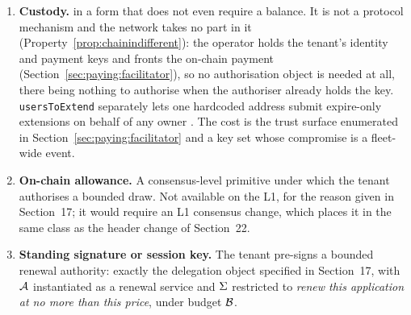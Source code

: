 \begin{enumerate}\setlength{\itemsep}{2pt}
\item \textbf{Custody.} 
in a form that does not even require a balance. It is not a protocol mechanism and the network takes
no part in it (Property~\ref{prop:chainindifferent}): the operator holds the tenant's identity and
payment keys and fronts the on-chain payment (Section~\ref{sec:paying:facilitator}), so no
authorisation object is needed at all, there being nothing to authorise when the authoriser already
holds the key. \texttt{usersToExtend}
separately lets one hardcoded address submit expire-only extensions on behalf of any owner
. The cost is the trust surface enumerated in
Section~\ref{sec:paying:facilitator} and a key set whose compromise is a fleet-wide event.
\item \textbf{On-chain allowance.} A consensus-level primitive under which the tenant authorises a
bounded draw. Not available on the \Flux L1, for the reason given in Section~17; it would require an
L1 consensus change, which places it in the same class as the header change of Section~22.
\item \textbf{Standing signature or session key.} The tenant pre-signs a bounded renewal authority:
exactly the delegation object specified in Section~17, with $\mathcal{A}$ instantiated as a renewal
service and $\Sigma$ restricted to \emph{renew this application at no more than this price}, under
budget $\mathcal{B}$.
\end{enumerate}

